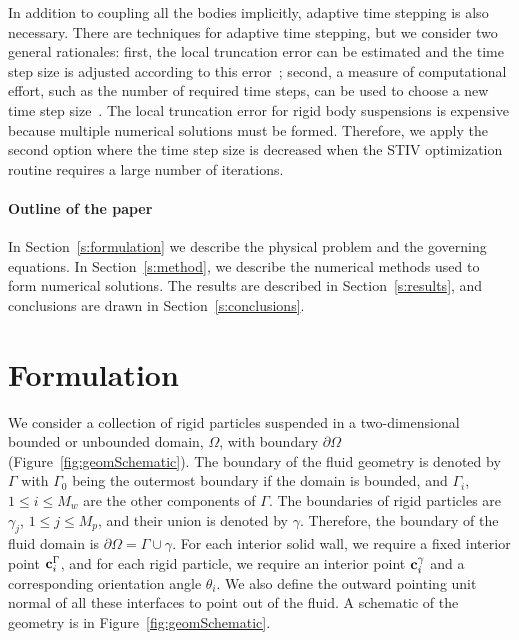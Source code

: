 \documentclass[preprint, 10pt]{elsarticle}
\begin{document}
In addition to coupling all the bodies implicitly, adaptive time
stepping is also necessary.  There are techniques for adaptive time
stepping, but we consider two general rationales: first, the local
truncation error can be estimated and the time step size is adjusted
according to this error~\cite{Quaife2015, Quaife2015a, Sorgentone2018};
second, a measure of computational effort, such as the number of
required time steps, can be used to choose a new time step
size~\cite{Kropinski1999}.  The local truncation error for rigid body
suspensions is expensive because multiple numerical solutions must be
formed.  Therefore, we apply the second option where the time step size
is decreased when the STIV optimization routine requires a large number
of iterations.

\paragraph{Outline of the paper}
In Section~\ref{s:formulation} we describe the physical problem and the
governing equations.  In Section~\ref{s:method}, we describe the
numerical methods used to form numerical solutions.
The results are described in Section~\ref{s:results}, and conclusions
are drawn in Section~\ref{s:conclusions}.


\section{Formulation\label{s:formulation}} 
We consider a collection of rigid particles suspended in a
two-dimensional bounded or unbounded domain, $\Omega$, with boundary
$\partial\Omega$ (Figure~\ref{fig:geomSchematic}).  The boundary of the
fluid geometry is denoted by $\Gamma$ with $\Gamma_0$ being the
outermost boundary if the domain is bounded, and $\Gamma_i$, $1\leq i
\leq M_w$ are the other components of $\Gamma$.  The boundaries of rigid
particles are $\gamma_j$, $1\leq j\leq M_p$, and their union is denoted
by $\gamma$. Therefore, the boundary of the fluid domain is $
\partial\Omega =\Gamma \cup \gamma$.  For each interior solid wall, we
require a fixed interior point ${\mathbf{c}}^\Gamma_i$, and for each rigid
particle, we require an interior point ${\mathbf{c}}^\gamma_i$ and a
corresponding orientation angle $\theta_i$.  We also define the outward
pointing unit normal of all these interfaces to point out of the fluid.
A schematic of the geometry is in Figure~\ref{fig:geomSchematic}.
\end{document}
